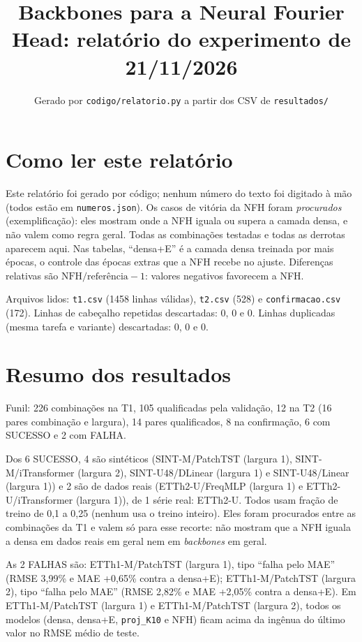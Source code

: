 \documentclass[11pt,a4paper]{article}
\title{Backbones para a Neural Fourier Head: relat\'orio do experimento de 21/11/2026}
\author{Gerado por \texttt{codigo/relatorio.py} a partir dos CSV de \texttt{resultados/}}
\date{}
\begin{document}
\maketitle

\section*{Como ler este relatório}
Este relatório foi gerado por código; nenhum número do texto foi digitado à mão (todos estão em \texttt{numeros.json}). Os casos de vitória da NFH foram \emph{procurados} (exemplificação): eles mostram onde a NFH iguala ou supera a camada densa, e não valem como regra geral. Todas as combinações testadas e todas as derrotas aparecem aqui. Nas tabelas, ``densa+E'' é a camada densa treinada por mais épocas, o controle das épocas extras que a NFH recebe no ajuste. Diferenças relativas são $\text{NFH}/\text{referência}-1$: valores negativos favorecem a NFH.

Arquivos lidos: \texttt{t1.csv} (1458 linhas válidas), \texttt{t2.csv} (528) e \texttt{confirmacao.csv} (172). Linhas de cabeçalho repetidas descartadas: 0, 0 e 0. Linhas duplicadas (mesma tarefa e variante) descartadas: 0, 0 e 0.

\section*{Resumo dos resultados}
Funil: 226 combinações na T1, 105 qualificadas pela validação, 12 na T2 (16 pares combinação e largura), 14 pares qualificados, 8 na confirmação, 6 com SUCESSO e 2 com FALHA.

Dos 6 SUCESSO, 4 são sintéticos (SINT-M/PatchTST (largura 1), SINT-M/iTransformer (largura 2), SINT-U48/DLinear (largura 1) e SINT-U48/Linear (largura 1)) e 2 são de dados reais (ETTh2-U/FreqMLP (largura 1) e ETTh2-U/iTransformer (largura 1)), de 1 série real: ETTh2-U. Todos usam fração de treino de 0,1 a 0,25 (nenhum usa o treino inteiro). Eles foram procurados entre as combinações da T1 e valem só para esse recorte: não mostram que a NFH iguala a densa em dados reais em geral nem em \emph{backbones} em geral.

As 2 FALHAS são: ETTh1-M/PatchTST (largura 1), tipo ``falha pelo MAE'' (RMSE \textminus{}3,99\% e MAE +0,65\% contra a densa+E); ETTh1-M/PatchTST (largura 2), tipo ``falha pelo MAE'' (RMSE \textminus{}2,82\% e MAE +2,05\% contra a densa+E).
 Em ETTh1-M/PatchTST (largura 1) e ETTh1-M/PatchTST (largura 2), todos os modelos (densa, densa+E, \texttt{proj\_K10} e NFH) ficam acima da ingênua do último valor no RMSE médio de teste.
\end{document}
